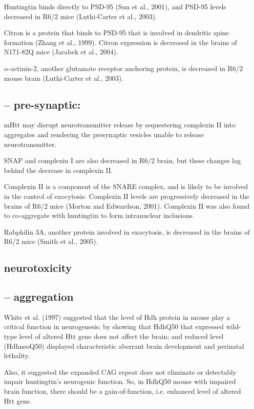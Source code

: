 Huntingtin binds directly to PSD-95 (Sun et al., 2001), and PSD-95 levels
decreased in R6/2 mice (Luthi-Carter et al., 2003). 

Citron is a protein that binds to PSD-95 that is involved in dendritic spine
formation (Zhang et al., 1999).  Citron expression is decreased in the brains of
N171-82Q mice (Jarabek et al., 2004). 

$\alpha$-actinin-2, another glutamate receptor anchoring protein, is decreased in R6/2
mouse brain (Luthi-Carter et al., 2003).

\subsection{-- pre-synaptic:}

mHtt may disrupt neurotransmitter release by sequestering complexin II into
aggregates and rendering the presynaptic vesicles unable to release
neurotransmitter.

SNAP and complexin I are also decreased in R6/2 brain, but these changes lag
behind the decrease in complexin II.

Complexin II is a component of the SNARE complex, and is likely to be involved
in the control of exocytosis. Complexin II levels are progressively decreased in
the brains of R6/2 mice (Morton and Edwardson, 2001).
 Complexin II was also found to co-aggregate with huntingtin to form
intranuclear inclusions.

Rabphilin 3A, another protein involved in exocytosis, is decreased in the brains
of R6/2 mice (Smith et al., 2005). 

\subsection{neurotoxicity}
\label{sec:HD-theory-neuro-toxicity}

\subsection{-- aggregation}
\label{sec:mHTT-protein-aggregate}
\label{sec:HD-theory-mHTT-aggregation}

White et al. (1997) suggested that the level of Hdh protein in mouse play a
critical function in neurogenesis; by showing that HdhQ50 that expressed
wild-type level of altered Htt gene does not affect the brain; and reduced level
(HdhneoQ50) displayed characteristic aberrant brain development and perinatal
lethality.

Also, it suggested the expanded CAG repeat does not eliminate or detectably
impair huntingtin's neurogenic function. So, in HdhQ50 mouse with impaired
brain function, there should be a gain-of-function, i.e.
enhanced level of altered Htt gene.

